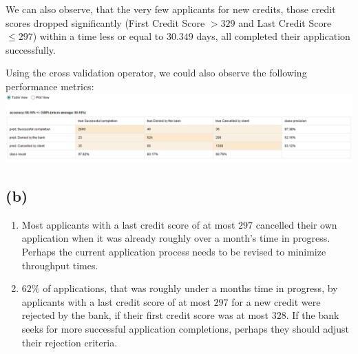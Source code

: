 \documentclass[../../main.tex]{subfiles}
\begin{document}
We can also observe, that the very few applicants for new credits, those credit scores dropped significantly (First Credit Score $> 329$ and Last Credit Score $\leq 297$) within a time less or equal to $30.349$ days, all completed their application successfully.

Using the cross validation operator, we could also observe the following performance metrics: \\
\includegraphics[width=\textwidth]{img/RapidMiner_Results_Performance.png}

\subsection*{(b)}
\begin{enumerate}
	\item	Most applicants with a last credit score of at most $297$ cancelled their own application when it was already roughly over a month's time in progress. Perhaps the current application process needs to be revised to minimize throughput times.
	\item	$62\%$ of applications, that was roughly under a months time in progress, by applicants with a last credit score of at most $297$ for a new credit were rejected by the bank, if their first credit score was at most $328$. If the bank seeks for more successful application completions, perhaps they should adjust their rejection criteria.
\end{enumerate}
\end{document}
